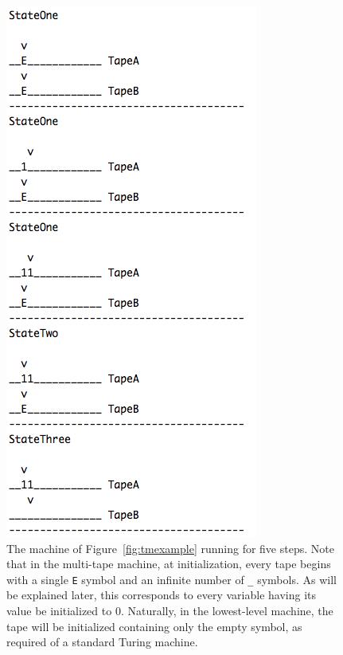 \documentclass[11pt]{report}
\begin{document}
\begin{figure} 
\begin{center} 
\includegraphics[scale=0.8]{figs/behavior.png} 
\caption{The machine of Figure~\ref{fig:tmexample} running for five steps. Note that in the multi-tape machine, at initialization, every tape begins with a single \texttt{E} symbol and an infinite number of \texttt{\_} symbols. As will be explained later, this corresponds to every variable having its value be initialized to 0. Naturally, in the lowest-level machine, the tape will be initialized containing only the empty symbol, as required of a standard Turing machine. \label{fig:example}} 
\end{center} 
\end{figure}
\end{document}
